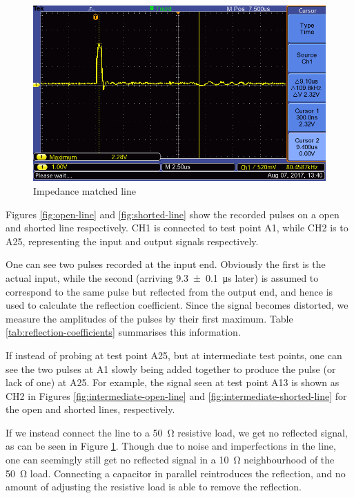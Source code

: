 \documentclass[a4paper]{scrartcl}
\begin{document}
\begin{figure}
    \centering
    \includegraphics[width = 15cm]{data/ALL0008/F0008TEK.png}
    \caption{Impedance matched line}
    \label{fig:impedance-matched-line}
\end{figure}

Figures \ref{fig:open-line} and \ref{fig:shorted-line} show the recorded pulses on a open and shorted line respectively. CH1 is connected to test point A1, while CH2 is to A25, representing the input and output signals respectively.

One can see two pulses recorded at the input end. Obviously the first is the actual input, while the second (arriving \SI{9.3 \pm 0.1}{\micro\second} later) is assumed to correspond to the same pulse but reflected from the output end, and hence is used to calculate the reflection coefficient. Since the signal becomes distorted, we measure the amplitudes of the pulses by their first maximum. Table \ref{tab:reflection-coefficients} summarises this information.

If instead of probing at test point A25, but at intermediate test points, one can see the two pulses at A1 slowly being added together to produce the pulse (or lack of one) at A25. For example, the signal seen at test point A13 is shown as CH2 in Figures \ref{fig:intermediate-open-line} and \ref{fig:intermediate-shorted-line} for the open and shorted lines, respectively.

If we instead connect the line to a \SI{50}{\ohm} resistive load, we get no reflected signal, as can be seen in Figure \ref{fig:impedance-matched-line}. Though due to noise and imperfections in the line, one can seemingly still get no reflected signal in a \SI{10}{\ohm} neighbourhood of the \SI{50}{\ohm} load. Connecting a capacitor in parallel reintroduces the reflection, and no amount of adjusting the resistive load is able to remove the reflection.
\end{document}
